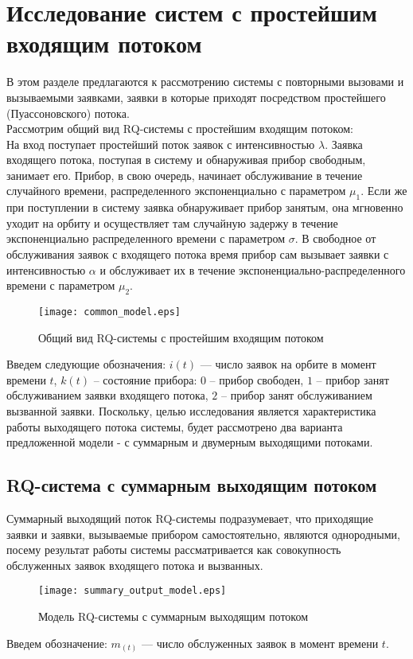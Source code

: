 \section {Исследование систем с простейшим входящим потоком}
В этом разделе предлагаются к рассмотрению системы с повторными вызовами и вызываемыми заявками, заявки в которые приходят посредством простейшего (Пуассоновского) потока.\\
Рассмотрим общий вид RQ-системы с простейшим входящим потоком:\\
 На вход поступает простейший поток заявок с интенсивностью $\lambda$. Заявка входящего потока, поступая в систему и обнаруживая прибор свободным, занимает его. Прибор, в свою очередь, начинает обслуживание в течение случайного времени, распределенного экспоненциально с параметром $\mu_{1}$. Если же при поступлении в систему заявка обнаруживает прибор занятым, она мгновенно уходит на орбиту и осуществляет там случайную задержу в течение экспоненциально распределенного времени с параметром $\sigma$. В свободное от обслуживания заявок с входящего потока время прибор сам вызывает заявки с интенсивностью $\alpha$ и обслуживает их в течение экспоненциально-распределенного времени с параметром $\mu_{2}$.
\begin{figure}[H]
	\centering
	\texttt{[image: common\_model.eps]}
	\caption{Общий вид RQ-системы с простейшим входящим потоком}
	\label{common_model_fig}
\end{figure}
Введем следующие обозначения: $i(t)$ — число заявок на орбите в момент времени $t$, $k(t)$ – состояние прибора: $0$ – прибор свободен, $1$ – прибор занят обслуживанием заявки входящего потока, $2$ – прибор занят обслуживанием вызванной заявки. 
Поскольку, целью исследования является характеристика работы выходящего потока системы, будет рассмотрено два варианта предложенной модели - с суммарным и двумерным выходящими потоками.

\subsection{RQ-система с суммарным выходящим потоком}
Суммарный выходящий поток RQ-системы подразумевает, что приходящие заявки и заявки, вызываемые прибором самостоятельно, являются однородными, посему результат работы системы рассматривается как совокупность обслуженных заявок входящего потока и вызванных. 
\begin{figure}[H]
	\centering
	\texttt{[image: summary\_output\_model.eps]}
	\caption{Модель RQ-системы с суммарным выходящим потоком}
	\label{summary_output_model_fig}
\end{figure}
Введем обозначение: $m_(t)$ — число обслуженных заявок в момент времени $t$.


